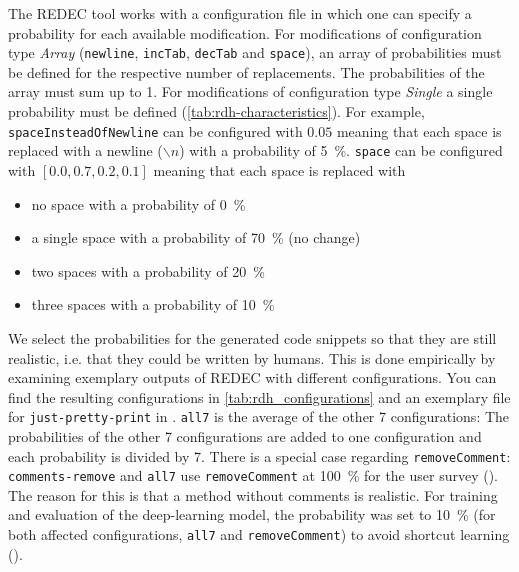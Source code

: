 \documentclass[%
class=scrreprt,
chapterprefix=false,%
open=right,%
twoside=true,%
paper=a4,%
logofile={Logo\_zentral\_farbig\_EN.png},%
thesistype=master,%
UKenglish,%
]{se2thesis}
\theoremstyle{definition}
\newcommand{\mod}{modification\xspace}
\newcommand{\mods}{modifications\xspace}
\newcommand{\RDH}{Readability Decreaser\xspace}
\newcommand{\rdh}{REDEC\xspace}
\newcommand{\RDHa}{\RDH (\rdh)\xspace} %
\newcommand{\none}{just-pretty-print\xspace} %
\newcommand{\nonet}{\texttt{\none}\xspace} %
\begin{document}
	
	The \rdh tool works with a configuration file in which one can specify a probability for each available \mod.
	For \mods of configuration type \textit{Array} (\texttt{newline}, \texttt{incTab}, \texttt{decTab} and \texttt{space}), an array of probabilities must be defined for the respective number of replacements. The probabilities of the array must sum up to 1.
	For \mods of configuration type \textit{Single} a single probability must be defined (\autoref{tab:rdh-characteristics}).
	For example, \texttt{spaceInsteadOfNewline} can be configured with $0.05$ meaning that each space is replaced with a newline ($\backslash n$) with a probability of 5~\%.
	\texttt{space} can be configured with $[0.0, 0.7, 0.2, 0.1]$ meaning that each space is replaced with
	\begin{itemize}
		\item no space with a probability of 0~\%
		\item a single space with a probability of 70~\% (no change)
		\item two spaces with a probability of 20~\%
		\item three spaces with a probability of 10~\% 
	\end{itemize}
		
	We select the probabilities for the generated code snippets so that they are still realistic, i.e. that they could be written by humans. This is done empirically by examining exemplary outputs of REDEC with different configurations. You can find the resulting configurations in \autoref{tab:rdh_configurations} and an exemplary file for \nonet in .
	\texttt{all7} is the average of the other 7 configurations: The probabilities of the other 7 configurations are added to one configuration and each probability is divided by 7.
	There is a special case regarding \texttt{removeComment}: \texttt{comments-remove} and \texttt{all7} use \texttt{removeComment} at 100~\% for the user survey (). The reason for this is that a method without comments is realistic. For training and evaluation of the deep-learning model, the probability was set to 10~\% (for both affected configurations, \texttt{all7} and \texttt{removeComment}) to avoid shortcut learning ().
	
\end{document}
